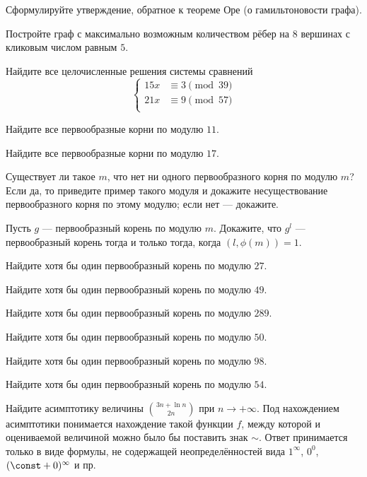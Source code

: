 Сформулируйте утверждение, обратное к теореме Оре (о гамильтоновости графа).

Постройте граф с максимально возможным количеством рёбер на $8$ вершинах с кликовым числом равным $5$.


Найдите все целочисленные решения системы сравнений
\[\left\{
\begin{aligned}
15x&\equiv 3\pmod{39} \\
21x&\equiv 9\pmod{57} \\
\end{aligned}
\right.\]

Найдите все первообразные корни по модулю $11$.

Найдите все первообразные корни по модулю $17$.

Существует ли такое $m$, что нет ни одного первообразного корня по модулю $m$? Если да, то приведите пример такого модуля и докажите несуществование первообразного корня по этому модулю; если нет --- докажите.

Пусть $g$ --- первообразный корень по модулю $m.$ Докажите, что $g^l$ --- первообразный корень тогда и только тогда, когда $(l, \phi(m)) = 1$.

Найдите хотя бы один первообразный корень по модулю $27$.

Найдите хотя бы один первообразный корень по модулю $49$.

Найдите хотя бы один первообразный корень по модулю $289$.

Найдите хотя бы один первообразный корень по модулю $50$.

Найдите хотя бы один первообразный корень по модулю $98$.

Найдите хотя бы один первообразный корень по модулю $54$.

Найдите асимптотику величины $\binom{3n+\ln{n}}{2n}$ при $n\to+\infty$. Под нахождением асимптотики понимается нахождение такой функции $f$, между которой и оцениваемой величиной можно было бы поставить знак $\sim$. Ответ принимается только в виде формулы, не содержащей неопределённостей вида $1^{\infty}$, $0^0$, $(\const+0)^\infty$ и пр.

